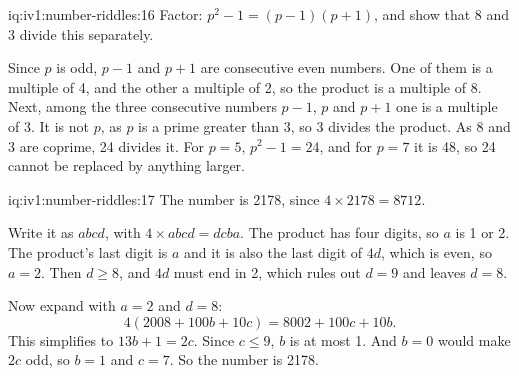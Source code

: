 \enlargethispage{-3\baselineskip}%
\begin{solution}{iq:iv1:number-riddles:16}
Factor: $p^2 - 1 = (p - 1)(p + 1)$, and show that 8 and 3 divide this separately.

Since $p$ is odd, $p - 1$ and $p + 1$ are consecutive even numbers. One of them is a multiple of 4, and the other a multiple of 2, so the product is a multiple of 8. Next, among the three consecutive numbers $p - 1$, $p$ and $p + 1$ one is a multiple of 3. It is not $p$, as $p$ is a prime greater than 3, so 3 divides the product. As 8 and 3 are coprime, 24 divides it. For $p = 5$, $p^2 - 1 = 24$, and for $p = 7$ it is 48, so 24 cannot be replaced by anything larger.

\end{solution}

\begin{solution}{iq:iv1:number-riddles:17}
The number is 2178, since $4 \times 2178 = 8712$.

Write it as $abcd$, with $4 \times abcd = dcba$. The product has four digits, so $a$ is 1 or 2. The product's last digit is $a$ and it is also the last digit of $4d$, which is even, so $a = 2$. Then $d \geq 8$, and $4d$ must end in 2, which rules out $d = 9$ and leaves $d = 8$.

Now expand with $a = 2$ and $d = 8$:
\[
4(2008 + 100b + 10c) = 8002 + 100c + 10b.
\]
This simplifies to $13b + 1 = 2c$. Since $c \leq 9$, $b$ is at most 1. And $b = 0$ would make $2c$ odd, so $b = 1$ and $c = 7$. So the number is 2178.

\end{solution}

